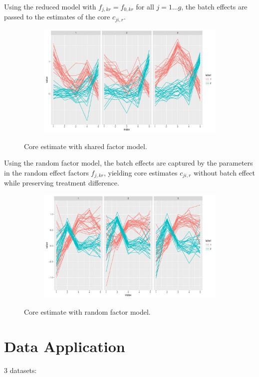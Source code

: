 \documentclass[12pt]{article}
\newcommand{\bfi}{\begin{figure}[H]}
\newcommand{\efi}{\end{figure}}
\newcommand{\bsfi}{\begin{subfigure}[t]}
\newcommand{\esfi}{\end{subfigure}}
\begin{document}
Using the reduced model with $f_{j,kr} = f_{0,kr}$ for all $j=1\ldots g$, the batch effects are passed to the estimates of the core $c_{ji,r}$.
\bfi
\centering
\bsfi{0.8\columnwidth}
\includegraphics[width=1\columnwidth]{../BatchEffectRemoval/BE_not_removed}
\esfi
\caption{Core estimate with shared factor model.}
\efi

Using the random factor model, the batch effects are captured by the parameters in the random effect factors $f_{j,kr}$, yielding core estimates $c_{ji,r}$ without batch effect while preserving treatment difference.

\bfi
\centering
\bsfi{0.8\columnwidth}
\includegraphics[width=1\columnwidth]{../BatchEffectRemoval/batch_removal}
\esfi
\caption{Core estimate with random factor model.}
\efi


\section{Data Application}

3 datasets:
\end{document}
